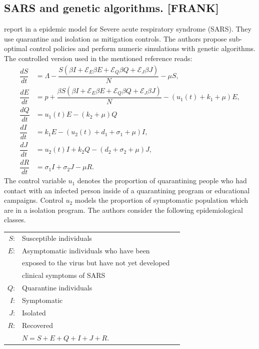
\subsection{SARS and genetic algorithms. [FRANK]}
\citeauthor{Yan2008} report in \cite{Yan2008} a epidemic model for
Severe acute respiratory syndrome (SARS). They use quarantine and 
isolation as mitigation controls. The authors propose sub-optimal 
control policies and perform numeric simulations with genetic 
algorithms. The controlled version used in the mentioned 
reference reads:
%
%
\begin{equation}\label{eqn:sars_model}
	\begin{aligned}
		\dfrac{dS}{dt} &=
			\Lambda 
			-\dfrac{
				S
				\left(
					\beta I 
					+ \mathcal{E}_E  \beta E
					+ \mathcal{E}_Q  \beta Q
					+ \mathcal{E}_J  \beta J
				\right)
			}{N}
			- \mu S,
		\\
		\dfrac{dE}{dt} &=
			p +
			\dfrac{
				\beta S
				\left(
					\beta I 
						+ \mathcal{E}_E \beta E
						+ \mathcal{E}_Q \beta Q
						+ \mathcal{E}_J \beta J
				\right)
			}{N}
			-(
				u_1(t) + k_1 + \mu
			)E,
		\\
		\dfrac{dQ}{dt} &=
			u_1(t) E 
			- (k_2 + \mu) Q
		\\
		\dfrac{dI}{dt} &=
			k_1 E 
			-(u_2(t) + d_1  + \sigma_1 + \mu) I,
		\\
		\dfrac{dJ}{dt} &=
			u_2(t) I 
			+ k_2 Q
			- (d_2 + \sigma_2 + \mu) J,
		\\
		\dfrac{dR}{dt} &=
			\sigma_1 I
			+\sigma_2 J
			- \mu R.
	\end{aligned}
\end{equation}
The control variable $u_1$ denotes the proportion of quarantining people 
who had contact with an infected person inside of a quarantining program or
educational campaigns. Control $u_2$ models the proportion of symptomatic 
population which are in a isolation program. The authors consider the 
following epidemiological classes.
\begin{table}[h!]
	\begin{center}
		\begin{tabular}{@{}rll@{}} 
			$S$: & Susceptible individuals 
			\\
			$E$: & Asymptomatic individuals who have been 
			\\
			   & exposed to the virus but have not yet developed 
			\\
			   & clinical symptoms of SARS 
			\\
			$Q$: & Quarantine individuals
			\\
			$I$: & Symptomatic 
			\\
			$J$: & Isolated
			\\
			$R$: & Recovered
			\\
				& $N = S + E + Q + I + J + R$.
		\end{tabular}
	\end{center}
\end{table}
